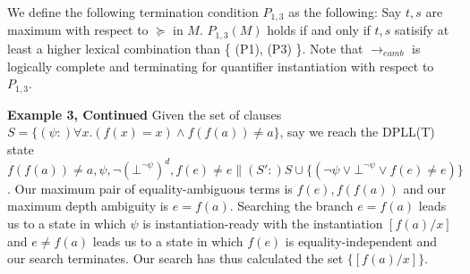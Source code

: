 \documentclass{llncs}
\newtheorem{thm}{Theorem}
\begin{document}
We define the following termination condition $P_{1,3}$ as the following:
Say $t, s$ are maximum with respect to $\succeq$ in $M$.
$P_{1,3}(M)$ holds if and only if $t, s$ satisify at least a higher lexical combination than \{ (P1), (P3) \}.
Note that $\rightarrow_{eamb}$ is logically complete and terminating for quantifier instantiation with respect to $P_{1,3}$.

\begin{comment}
\begin{thm}
Given a candidate-satisifiable DPLL(T) state $M \parallel F$, if $M \rightarrow_{eamb} M'$ and $M'$ is non-terminal for quantifier instantiation with respect to $P_{eind}$, then there exists a pair of equality-ambiguous terms $t, s$ that are maximum with respect to $\succeq$.  
Futhermore, either $t$ is not an instantiation-constant, or $t$ and $s$ are instantiation constants such that $M \models t = s$.
\end{thm}
\begin{proof}
Say $M'$ is non-terminal for quantifier instantiation with respect to $P_{eind}$.
Therefore, all quantified formula $\psi_i \in M'$ are not instantiation-ready and there exists $e_i \in M$ for each $\psi_i$ that $M \not\models (e_i = s_i)$ for any concrete ground term $s_i$. 

Assume by contradiction that $t$ is an instantiation constant and $s$ is not an instantiation constant such that $M \models t = s$.
By our ordering, there does not exist a non-instantiation constant term $t'$ that is equality-ambiguous with any other term $s'$.
Since $P_{EUF}$ does not hold, there exists at least one term $t''$ such that 

In particular, this means that our unsolved constants $e_i$ do not exist as proper subterms of any term $t'$.
Therefore, since each $e_i$ is in $M$, it must be the case that either $M \models e_i \neq t''$ for some term $t''$ or $M \models e_i = t_e$ for some non-concrete term $t_e$.
\end{proof}
\end{comment}

{\bf Example 3, Continued}
Given the set of clauses $S = \{ (\psi :)\forall x. (f( x ) = x) \wedge f( f( a ) ) \neq a \}$, say we reach the DPLL(T) state $f( f( a ) ) \neq a, \psi, \neg (\bot^{\neg \psi})^d, f(e) \neq e \parallel (S':)S \cup \{ ( \neg \psi \vee \bot^{\neg \psi } \vee f( e ) \neq e ) \}$.
Our maximum pair of equality-ambiguous terms is $f( e ), f( f( a ) )$ and our maximum depth ambiguity is $e = f( a )$.
Searching the branch $e = f( a )$ leads us to a state in which $\psi$ is instantiation-ready with the instantiation $[f(a)/x]$ and $e \neq f( a )$ leads us to a state in which $f( e )$ is equality-independent and our search terminates.
Our search has thus calculated the set $\{ [f(a)/x] \}$.
\end{document}
